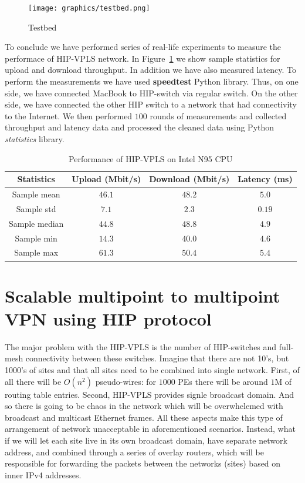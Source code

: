 \begin{figure}[!ht]
    \centering
    \texttt{[image: graphics/testbed.png]}
    \caption{Testbed}
    \label{fig:testbed}
\end{figure}

To conclude we have performed series of real-life experiments to measure the 
performace of HIP-VPLS network. In Figure~\ref{tab:vpls-performance} we show
sample statistics for upload and download throughput. In addition we have also
measured latency. To perform the measurements we have used {\bf speedtest}
Python library. Thus, on one side, we have connected MacBook to HIP-switch via regular
switch. On the other side, we have connected the other HIP switch to a network 
that had connectivity to the Internet. We then performed $100$ rounds of measurements
and collected throughput and latency data and processed the cleaned data using Python
{\it statistics} library.

\begin{table}
    \centering
    \begin{tabular}{|c|c|c|c|}
    \hline
    Statistics     & Upload (Mbit/s)        & Download (Mbit/s)     & Latency (ms) \\\hline
    Sample mean    & $46.1$                  & $48.2$                 & $5.0$         \\
    Sample std     & $7.1$                   & $2.3$                  & $0.19$        \\
    Sample median  & $44.8$                  & $48.8$                 & $4.9$         \\
    Sample min     & $14.3$                  & $40.0$                 & $4.6$         \\
    Sample max     & $61.3$                  & $50.4$                 & $5.4$         \\
    \hline
    \end{tabular}
    \caption{Performance of HIP-VPLS on Intel N95 CPU}  
    \label{tab:vpls-performance}
\end{table}

\section{Scalable multipoint to multipoint VPN using HIP protocol}

The major problem with the HIP-VPLS is the number of HIP-switches and
full-mesh connectivity between these switches. Imagine that there are 
not 10's, but 1000's of sites and that all sites need to be 
combined into single network. First, of all there will be 
$O(n^2)$ pseudo-wires: for $1000$ PEs there will be  
around $1$M of routing table entries. Second, HIP-VPLS provides 
signle broadcast domain. And so there is going to be 
chaos in the network which will be overwhelemed with broadcast
and multicast Ethernet frames. All these aspects make this type of
arrangement of network unacceptable in aforementioned scenarios.
Instead, what if we will let each site live in its own broadcast
domain, \ie have separate network address, and combined through 
a series of overlay routers, which will be responsible for 
forwarding the packets between the networks (sites) based on 
inner IPv4 addresses. 


